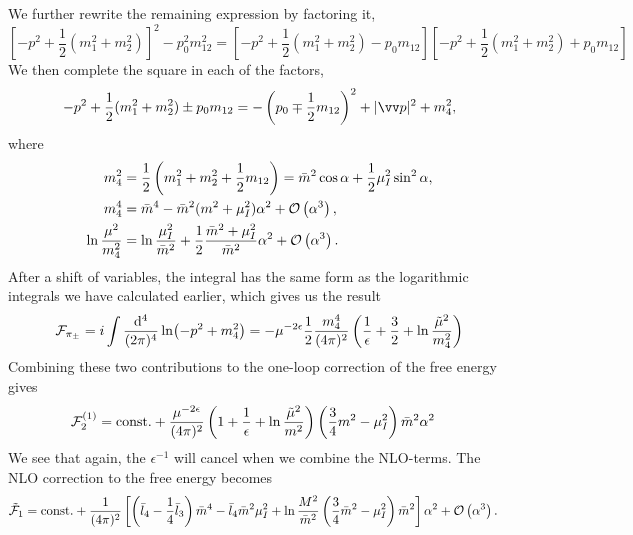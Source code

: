 We further rewrite the remaining expression by factoring it,
\begin{equation}
    \left[-p^2 + \frac{1}{2}(m_1^2 + m_2^2)\right]^2 - p_0^2 m_{12}^2
    = \left[-p^2 + \frac{1}{2}(m_1^2 + m_2^2) - p_0 m_{12} \right]
    \left[-p^2 + \frac{1}{2}(m_1^2 + m_2^2) + p_0 m_{12} \right]
\end{equation}
We then complete the square in each of the factors,
\begin{equation}
    - p^2 + \frac{1}{2}(m_1^2 + m_2^2) \pm p_0 m_{12}
    = - \left(p_0 \mp \frac{1}{2}m_{12}\right)^2 + |\vv p|^2 + m_4^2,
\end{equation}
where
\begin{align}
    m_4^2 &= \frac{1}{2}\left(m_1^2 +m_2^2 +\frac{1}{2}m_{12}\right)
    = \bar m^2 \cos\alpha + \frac{1}{2} \mu_I^2 \sin^2 \alpha, \\
    m_4^4
    &= \bar m^4 - \bar m^2(m^2 + \mu_I^2) \alpha^2 + \Oh[3]{\alpha}, \\
    \ln \frac{\mu^2}{m_4^2} 
    &= \ln \frac{\mu_I^2}{\bar m^2} + \frac{1}{2}\frac{\bar m^2 + \mu_I^2}{\bar m^2}\alpha^2
    + \Oh[3]{\alpha}.
\end{align}
After a shift of variables, the integral has the same form as the logarithmic integrals we have calculated earlier, which gives us the result
\begin{equation}
    \Ef_{\pi_\pm}
    = i \int \frac{\dd^4}{(2\pi)^4}
    \ln(-p^2 + m_4^2)
    = 
    - \mu^{-2\epsilon}\frac{1}{2} \frac{m_4^4}{(4 \pi)^2}
    \left(\frac{1}{\epsilon} + \frac{3}{2} + \ln \frac{\tilde \mu^2}{m_4^2}\right)
\end{equation}
Combining these two contributions to the one-loop correction of the free energy gives
\begin{align*}
    \Ef_2^{(1)}
    &=
    \mathrm{const.}
    +
    \frac{\mu^{-2 \epsilon } }{(4 \pi)^2} 
    \left(1 + \frac{1}{\epsilon} + \ln \frac{\tilde \mu^2}{m^2}\right)
    \left(\frac{3}{4}m^2 - \mu_I^2\right)
    \bar m^2 \alpha^2
\end{align*}
We see that again, the $\epsilon^{-1}$ will cancel when we combine the NLO-terms.
The NLO correction to the free energy becomes
\begin{align}
    \tilde \Ef_1
    & = 
    \const+ 
    \frac{1}{(4\pi)^2}
    \left[
        \left(
            \bar l_4 - \frac{1}{4}\bar l_3
        \right)\bar m^4
        -\bar l_4\bar m^2\mu_I^2
        + \ln\frac{M^2}{\bar m^2}
        \left(\frac{3}{4}\bar m^2 - \mu_I^2\right)\bar m^2
    \right]\alpha^2
    + \Oh[3]{\alpha}.
\end{align}
